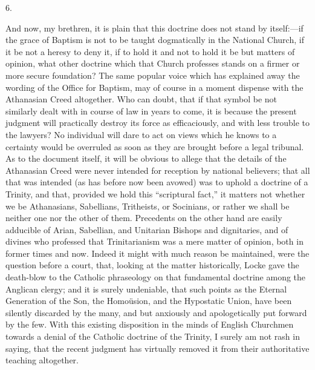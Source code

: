 6.

And now, my brethren, it is plain that this doctrine does not stand
by itself:—if the grace of Baptism is not to be taught dogmatically
in the National Church, if it be not a heresy to deny it, if to hold
it and not to hold it be but matters of opinion, what other doctrine
which that Church professes stands on a firmer or more secure
foundation? The same popular voice which has explained away the
wording of the Office for Baptism, may of course in a moment dispense
with the Athanasian Creed altogether. Who can doubt, that if that
symbol be not similarly dealt with in course of law in years to come,
it is because the present judgment will practically destroy its force
as efficaciously, and with less trouble to the lawyers? No individual
will dare to act on views which he knows to a certainty would be
overruled as soon as they are brought before a legal tribunal. As to
the document itself, it will be obvious to allege that the details of
the Athanasian Creed were never intended for reception by national
believers; that all that was intended (as has before now been avowed)
was to uphold a doctrine of a Trinity, and that, provided we hold this
``scriptural fact,'' it matters not whether we be Athanasians,
Sabellians, Tritheists, or Socinians, or rather we shall be neither
one nor the other of them. Precedents on the other hand are easily
adducible of Arian, Sabellian, and Unitarian Bishops and dignitaries,
and of divines who professed that Trinitarianism was a mere matter of
opinion, both in former times and now. Indeed it might with much
reason be maintained, were the question before a court, that, looking
at the matter historically, Locke gave the death-blow to the Catholic
phraseology on that fundamental doctrine among the Anglican clergy;
and it is surely undeniable, that such points as the Eternal
Generation of the Son, the Homoüsion, and the Hypostatic Union, have
been silently discarded by the many, and but anxiously and
apologetically put forward by the few. With this existing disposition
in the minds of English Churchmen towards a denial of the Catholic
doctrine of the Trinity, I surely am not rash in saying, that the
recent judgment has virtually removed it from their authoritative
teaching altogether.

